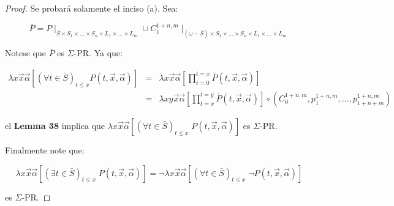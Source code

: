   \begin{proof}
    \par Se probará solamente el inciso (a). Sea:

    \[
      \bar{P} = P \mid_{\bar{S} \times S_{1} \times \dotsc \times S_{n} \times L_{1} \times \dotsc \times L_{m}} \cup
      C_{1}^{1+n,m} \mid_{(\omega -\bar{S}) \times S_{1} \times \dotsc \times S_{n} \times L_{1} \times \dotsc \times
      L_{m}}
    \]

    \par Notese que $\bar{P}$ es $\Sigma$-PR. Ya que:

    \begin{eqnarray}
      \nonumber \lambda x\vec{x}\vec{\alpha}\left[(\forall t\in \bar{S})_{t\leq x} P(t,\vec{x},\vec{\alpha})\right] &=&
        \lambda x\vec{x}\vec{\alpha}\left[\prod\limits_{t=0}^{t=x}\bar{P}(t,\vec{x},\vec{\alpha})\right] \\
      \nonumber &=& \lambda xy\vec{x}\vec{\alpha}\left[\prod\limits_{t=x}^{t=y}\bar{P}(t,\vec{x},\vec{\alpha})\right]
        \circ \left(C_{0}^{1+n,m}, p_{1}^{1+n,m}, \dotsc, p_{1+n+m}^{1+n,m}\right)
    \end{eqnarray}

    \par el \textbf{Lemma 38} implica que $\lambda x\vec{x}\vec{\alpha}\left[(\forall t\in \bar{S})_{t\leq x} \;
    P(t,\vec{x},\vec{\alpha})\right]$ es $\Sigma$-PR.

    \par Finalmente note que:

    \[
      \lambda x\vec{x}\vec{\alpha}\left[(\exists t\in \bar{S})_{t\leq x} \; P(t,\vec{x},\vec{\alpha})\right] = \lnot
      \lambda x\vec{x}\vec{\alpha}\left[(\forall t\in \bar{S})_{t\leq x} \; \lnot P(t,\vec{x},\vec{\alpha})\right]
    \]

    \par es $\Sigma$-PR.
  \end{proof}

